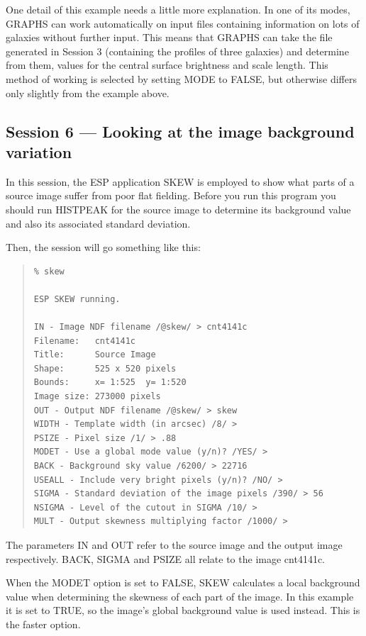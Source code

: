 \documentclass[twoside,11pt]{article}
\newcommand{\xlabel}[1]{}
\newenvironment{myquote}{\begin{quote}\begin{small}}{\end{small}\end{quote}}
\begin{document}
One detail of this example needs a little more explanation. In one
of its modes, GRAPHS can work automatically on input files
containing information on lots of galaxies without further 
input. This means that GRAPHS can take the file generated in Session
3 (containing the profiles of three galaxies) and determine from them,
values for the central surface brightness and scale length.
This method of working is selected by setting MODE to FALSE, but otherwise 
differs only slightly from the example above. 



\subsection{Session 6 --- Looking at the image background variation}
\xlabel{SESSION6}
In this  session, the ESP application SKEW is employed to show
what parts of a source image suffer from poor flat fielding.
Before you run this program you should run HISTPEAK for the source image to
determine its background value and also its associated standard deviation.

Then, the session will go something like this:

\begin{myquote}
\begin{verbatim}
% skew
 
ESP SKEW running.

IN - Image NDF filename /@skew/ > cnt4141c
Filename:   cnt4141c
Title:      Source Image
Shape:      525 x 520 pixels
Bounds:     x= 1:525  y= 1:520
Image size: 273000 pixels
OUT - Output NDF filename /@skew/ > skew
WIDTH - Template width (in arcsec) /8/ > 
PSIZE - Pixel size /1/ > .88
MODET - Use a global mode value (y/n)? /YES/ > 
BACK - Background sky value /6200/ > 22716
USEALL - Include very bright pixels (y/n)? /NO/ > 
SIGMA - Standard deviation of the image pixels /390/ > 56
NSIGMA - Level of the cutout in SIGMA /10/ > 
MULT - Output skewness multiplying factor /1000/ > 
\end{verbatim}
\end{myquote}

The parameters IN and OUT refer to the source image and the output image
respectively. BACK, SIGMA and PSIZE all relate to the image 
cnt4141c. 

When the MODET option is set to FALSE, SKEW calculates a local background
value when determining the skewness of each part of the image. In this
example it is set to TRUE, so the image's global background value is used
instead. This is the faster option.
\end{document}
